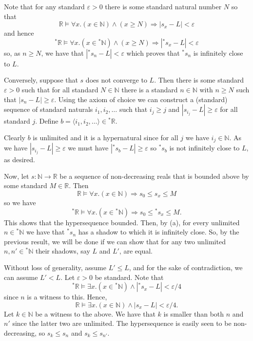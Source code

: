 \documentclass{article}
\theoremstyle{theorem}
\begin{document}
\begin{enumerate}[leftmargin=*]
\begin{enumerate}
				Note that for any standard $\varepsilon >0$ there is some standard natural number $N$ so that 
				\[
					\mathbb{R} \models \forall x. (x\in \mathbb{N}) \wedge (x \geq N) \Rightarrow |s_x - L| < \varepsilon
				\]
				and hence
				\[
					{}^*\mathbb{R} \models \forall x. (x\in {}^*\mathbb{N}) \wedge (x \geq N) \Rightarrow |{}^*s_x - L| < \varepsilon
				\]
				so, as $n\geq N$, we have that $|{}^*s_n - L| < \varepsilon$ which proves that ${}^*s_n$ is infinitely close to $L$.
				
				Conversely, suppose that $s$ does not converge to $L$. Then there is some standard $\varepsilon >0$ such that for all standard $N\in\mathbb{N}$ there is a standard $n\in\mathbb{N}$ with $n\geq N$ such that $|s_n - L| \geq \varepsilon$. Using the axiom of choice we can construct a (standard) sequence of standard naturals $i_1,i_2,\ldots$ such that $i_j \geq j$ and $|s_{i_j} - L| \geq \varepsilon$ for all standard $j$. Define $b = \langle i_1, i_2,\ldots \rangle\in {}^*\mathbb{R}$.
				
				Clearly $b$ is unlimited and it is a hypernatural since for all $j$ we have $i_j\in\mathbb{N}$. As we have $|s_{i_j} - L| \geq \varepsilon$ we must have $|{}^*s_b - L| \geq \varepsilon$ so ${}^*s_b$ is not infinitely close to $L$, as desired.
				
				Now, let $s\colon \mathbb{N} \to \mathbb{R}$ be a sequence of non-decreasing reals that is bounded above by some standard $M \in\mathbb{R}$. Then
				\[
					\mathbb{R} \models \forall x. (x\in \mathbb{N}) \Rightarrow s_0 \leq s_{x} \leq M
				\]
				so we have
				\[
					{}^*\mathbb{R} \models \forall x. (x\in {}^*\mathbb{N}) \Rightarrow s_0 \leq {}^*s_{x} \leq M.
				\]
				This shows that the hypersequence bounded. Then, by (a), for every unlimited $n\in{}^*\mathbb{N}$ we have that ${}^*s_{n}$ has a shadow to which it is infinitely close. So, by the previous result, we will be done if we can show that for any two unlimited $n,n'\in{}^*\mathbb{N}$ their shadows, say $L$ and $L'$, are equal.
				
				Without loss of generality, assume $L' \leq L$, and for the sake of contradiction, we can assume $L' < L$. Let $\varepsilon >0$ be standard. Note that
				\[
					{}^*\mathbb{R} \models \exists x. (x\in {}^*\mathbb{N}) \wedge |{}^*s_x- L| < \varepsilon/4
				\]
				since $n$ is a witness to this. Hence,
				\[
					\mathbb{R} \models \exists x. (x\in \mathbb{N}) \wedge |s_x- L| < \varepsilon/4.
				\]
				Let $k\in\mathbb{N}$ be a witness to the above. We have that $k$ is smaller than both $n$ and $n'$ since the latter two are unlimited. The hypersequence is easily seen to be non-decreasing, so $s_k\leq s_n$ and $s_k\leq s_{n'}$.
				

\end{enumerate}
\end{enumerate}
\end{document}
